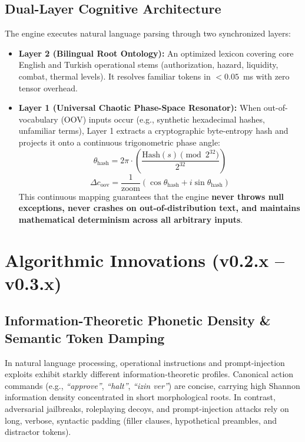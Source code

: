 \documentclass[10pt,journal,compsoc,twocolumn]{article}
\begin{document}
\subsection{Dual-Layer Cognitive Architecture}
The engine executes natural language parsing through two synchronized layers:
\begin{itemize}
    \item \textbf{Layer 2 (Bilingual Root Ontology):} An optimized lexicon covering core English and Turkish operational stems (authorization, hazard, liquidity, combat, thermal levels). It resolves familiar tokens in $< 0.05$~ms with zero tensor overhead.
    \item \textbf{Layer 1 (Universal Chaotic Phase-Space Resonator):} When out-of-vocabulary (OOV) inputs occur (e.g., synthetic hexadecimal hashes, unfamiliar terms), Layer 1 extracts a cryptographic byte-entropy hash and projects it onto a continuous trigonometric phase angle:
    \begin{equation}
    \theta_{\text{hash}} = 2\pi \cdot \left( \frac{\text{Hash}(s) \pmod{2^{32}}}{2^{32}} \right)
    \end{equation}
    \begin{equation}
    \Delta c_{\text{oov}} = \frac{1}{\text{zoom}} \left( \cos \theta_{\text{hash}} + i \sin \theta_{\text{hash}} \right)
    \end{equation}
    This continuous mapping guarantees that the engine \textbf{never throws null exceptions, never crashes on out-of-distribution text, and maintains mathematical determinism across all arbitrary inputs}.
\end{itemize}

\section{Algorithmic Innovations (v0.2.x -- v0.3.x)}
\label{sec:acoustic}

\subsection{Information-Theoretic Phonetic Density \& Semantic Token Damping}
In natural language processing, operational instructions and prompt-injection exploits exhibit starkly different information-theoretic profiles. Canonical action commands (e.g., \textit{``approve''}, \textit{``halt''}, \textit{``izin ver''}) are concise, carrying high Shannon information density concentrated in short morphological roots. In contrast, adversarial jailbreaks, roleplaying decoys, and prompt-injection attacks \cite{perez2022ignore} rely on long, verbose, syntactic padding (filler clauses, hypothetical preambles, and distractor tokens).
\end{document}
